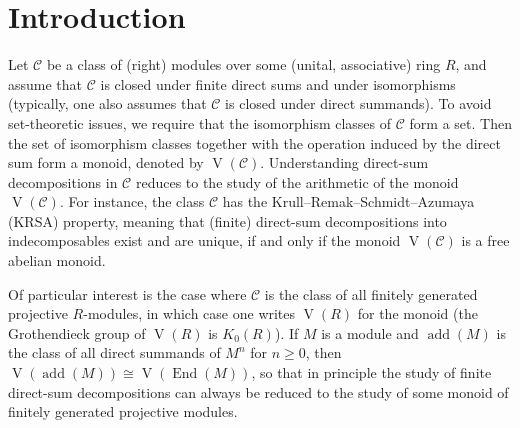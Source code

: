 \documentclass[a4paper,11pt,oneside]{amsart}
\theoremstyle{remark}
\DeclareMathOperator{\add}{add}
\DeclareMathOperator{\End}{End}
\newcommand{\cC}{\mathcal C}
\DeclareMathOperator{\Vmon}{V}
\begin{document}
\date{}


\maketitle


\section{Introduction}

Let $\cC$ be a class of (right) modules over some (unital, associative) ring $R$, and assume that $\cC$ is closed under finite direct sums and under isomorphisms (typically, one also assumes that $\cC$ is closed under direct summands).
To avoid set-theoretic issues, we require that the isomorphism classes of $\cC$ form a set.
Then the set of isomorphism classes together with the operation induced by the direct sum form a monoid, denoted by $\Vmon(\cC)$.
Understanding direct-sum decompositions in $\cC$ reduces to the study of the arithmetic of the monoid $\Vmon(\cC)$.
For instance, the class $\cC$ has the Krull--Remak--Schmidt--Azumaya (KRSA) property, meaning that (finite) direct-sum decompositions into indecomposables exist and are unique, if and only if the monoid $\Vmon(\cC)$ is a free abelian monoid.

Of particular interest is the case where $\cC$ is the class of all finitely generated projective $R$-modules, in which case one writes $\Vmon(R)$ for the monoid (the Grothendieck group of $\Vmon(R)$ is $K_0(R)$).
If $M$ is a module and $\add(M)$ is the class of all direct summands of $M^n$ for $n \ge 0$, then $\Vmon(\add(M)) \cong \Vmon(\End(M))$, so that in principle the study of finite direct-sum decompositions can always be reduced to the study of some monoid of finitely generated projective modules.
\end{document}
